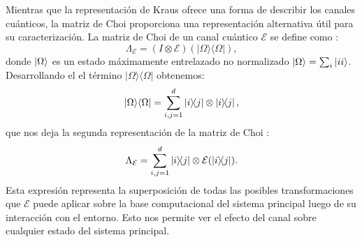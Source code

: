 \documentclass[letterpaper,12pt]{thesisECFM}
\theoremstyle{plain}
\theoremstyle{definition}
\theoremstyle{definition}
\theoremstyle{remark}
\newcommand{\1}{\mathbb{1}}
\begin{document}
Mientras que la representación de Kraus ofrece una forma de describir los canales cuánticos, la matriz de Choi proporciona una representación alternativa útil para su caracterización. 
La matriz de Choi de un canal cuántico $\mathcal{E}$ se define como \cite{QProcess}:
\begin{equation} 
\Lambda_{\mathcal{E}} = (I \otimes \mathcal{E})(|\Omega\rangle\langle\Omega|),
\end{equation} 
donde $\ket{\Omega}$ es un estado máximamente entrelazado no normalizado $\ket{\Omega} = \sum_i \ket{ii}$.
Desarrollando el el término $|\Omega\rangle\langle\Omega|$ obtenemos:
\begin{equation}
|\Omega\rangle\langle\Omega| = \sum_{i, j=1}^{d} \ketbra{i}{j} \otimes \ketbra{i}{j},
\end{equation} 
que nos deja la segunda representación de la matriz de Choi
\cite{Qiskit_documentation,QProcess}:
\begin{equation}\label{ec:Choi_ketbra}
\Lambda_{\mathcal{E}} = \sum_{i, j=1}^{d} \ketbra{i}{j} \otimes \mathcal{E}(\ketbra{i}{j}).
\end{equation}
Esta expresión representa la superposición de todas las posibles transformaciones que $\mathcal{E}$ puede aplicar sobre la base computacional del sistema principal luego de su interacción con el entorno. Esto nos permite ver el efecto del canal sobre cualquier estado del sistema principal.
\end{document}
